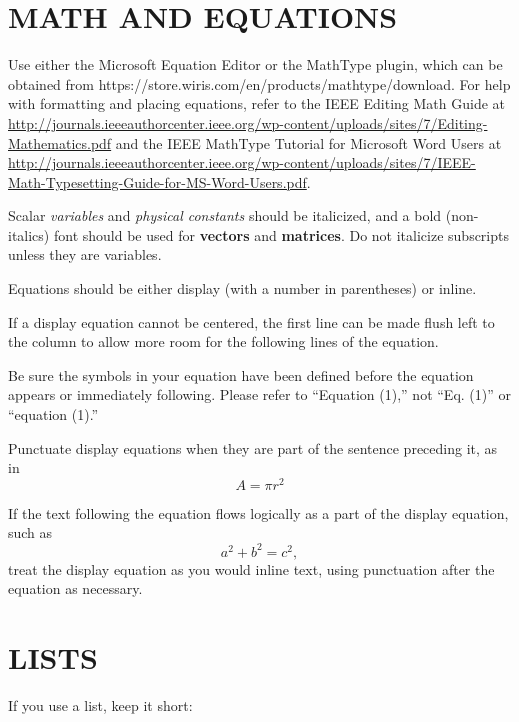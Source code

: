 \documentclass{IEEEcsmag}
\begin{document}
\section{MATH AND EQUATIONS}

Use either the Microsoft Equation Editor or the MathType plugin, which can be obtained from https://store.wiris.com/en/products/mathtype/download. For help with formatting and placing equations, refer to the IEEE Editing Math Guide at \url{http://journals.ieeeauthorcenter.ieee.org/wp-content/uploads/sites/7/Editing-Mathematics.pdf} and the IEEE MathType Tutorial for Microsoft Word Users at \url{http://journals.ieeeauthorcenter.ieee.org/wp-content/uploads/sites/7/IEEE-Math-Typesetting-Guide-for-MS-Word-Users.pdf}.


Scalar {\it variables} and {\it physical constants} should be italicized, and a bold (non-italics) font should be used for {\bf vectors} and {\bf matrices}. Do not italicize subscripts unless they are variables.

Equations should be either display (with a number in parentheses) or inline.   

If a display equation cannot be centered, the first line can be made flush left to the column to allow more room for the following lines of the equation.


Be sure the symbols in your equation have been defined before the equation appears or immediately following. Please refer to ``Equation (1),'' not ``Eq. (1)'' or ``equation (1).''

Punctuate display equations when they are part of the sentence preceding it, as in
\begin{equation}
A=\pi r^2
\end{equation}

If the text following the equation flows logically as a part of the display equation, such as
\begin{equation}
a^2 + b^2 = c^2, 
\end{equation}
treat the display equation as you would inline text, using punctuation after the equation as necessary.\vspace*{3.5pt}

\section{LISTS}

If you use a list, keep it short:
\end{document}
